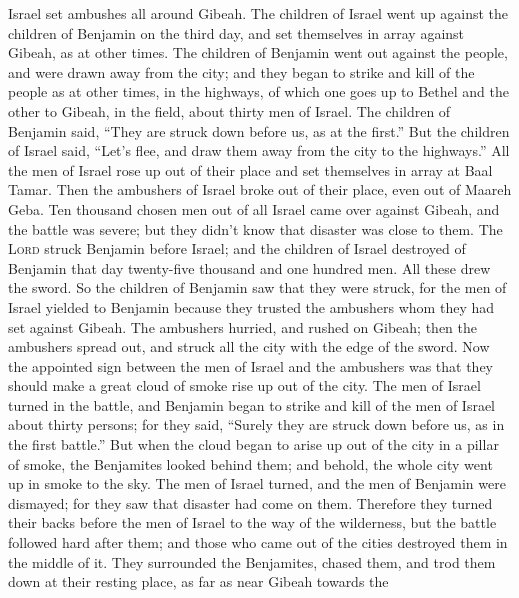  Israel set ambushes all around Gibeah. 
The children of Israel went up against the children of Benjamin on the
third day, and set themselves in array against Gibeah, as at other
times.  The children of Benjamin went out against the
people, and were drawn away from the city; and they began to strike and
kill of the people as at other times, in the highways, of which one goes
up to Bethel and the other to Gibeah, in the field, about thirty men of
Israel.  The children of Benjamin said, ``They are struck
down before us, as at the first.'' But the children of Israel said,
``Let's flee, and draw them away from the city to the highways.''
 All the men of Israel rose up out of their place and set
themselves in array at Baal Tamar. Then the ambushers of Israel broke
out of their place, even out of Maareh Geba.  Ten
thousand chosen men out of all Israel came over against Gibeah, and the
battle was severe; but they didn't know that disaster was close to them.
 The \textsc{Lord} struck Benjamin before Israel; and the
children of Israel destroyed of Benjamin that day twenty-five thousand
and one hundred men. All these drew the sword.  So the
children of Benjamin saw that they were struck, for the men of Israel
yielded to Benjamin because they trusted the ambushers whom they had set
against Gibeah.  The ambushers hurried, and rushed on
Gibeah; then the ambushers spread out, and struck all the city with the
edge of the sword.  Now the appointed sign between the
men of Israel and the ambushers was that they should make a great cloud
of smoke rise up out of the city.  The men of Israel
turned in the battle, and Benjamin began to strike and kill of the men
of Israel about thirty persons; for they said, ``Surely they are struck
down before us, as in the first battle.''  But when the
cloud began to arise up out of the city in a pillar of smoke, the
Benjamites looked behind them; and behold, the whole city went up in
smoke to the sky.  The men of Israel turned, and the men
of Benjamin were dismayed; for they saw that disaster had come on them.
 Therefore they turned their backs before the men of
Israel to the way of the wilderness, but the battle followed hard after
them; and those who came out of the cities destroyed them in the middle
of it.  They surrounded the Benjamites, chased them, and
trod them down at their resting place, as far as near Gibeah towards the
